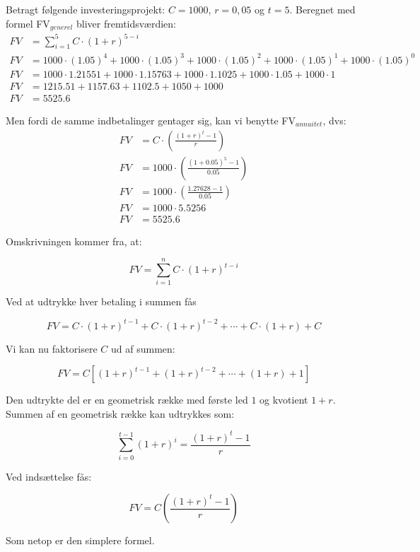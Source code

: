 \documentclass[10pt,reqno, usenames]{article}
\begin{document}
\newpage
\begin{tcolorbox}[breakable, colback=red!5!white, colframe=red!50!black, title= Eksempel 2: Beregning af fremtidsværdi for betalingsrækker]
Betragt følgende investeringsprojekt: $C=1000$, $r=0,05$ og $t=5$. Beregnet med formel FV$_{generel}$ bliver fremtidsværdien: 
\begin{align*}
FV &= \sum_{i=1}^{5} C \cdot (1 + r)^{5-i} \\
FV &= 1000 \cdot (1.05)^4 + 1000 \cdot (1.05)^3 + 1000 \cdot (1.05)^2 + 1000 \cdot (1.05)^1 + 1000 \cdot (1.05)^0 \\
FV &= 1000 \cdot 1.21551 + 1000 \cdot 1.15763 + 1000 \cdot 1.1025 + 1000 \cdot 1.05 + 1000 \cdot 1 \\
FV &= 1215.51 + 1157.63 + 1102.5 + 1050 + 1000 \\
FV &= 5525.6
\end{align*}

Men fordi de samme indbetalinger gentager sig, kan vi benytte FV$_{annuitet}$, dvs: 
\begin{align*}
FV &= C \cdot \left( \frac{(1 + r)^t - 1}{r} \right) \\
FV &= 1000 \cdot \left( \frac{(1 + 0.05)^5 - 1}{0.05} \right) \\
FV &= 1000 \cdot \left( \frac{1.27628 - 1}{0.05} \right) \\
FV &= 1000 \cdot 5.5256 \\
FV &= 5525.6
\end{align*}

Omskrivningen kommer fra, at: 

\[
FV = \sum_{i=1}^{n} C \cdot (1 + r)^{t-i}
\]

Ved at udtrykke hver betaling i summen fås

\[
FV = C \cdot (1 + r)^{t-1} + C \cdot (1 + r)^{t-2} + \cdots + C \cdot (1 + r) + C
\]

Vi kan nu faktorisere \( C \) ud af summen:

\[
FV = C \left[ (1 + r)^{t-1} + (1 + r)^{t-2} + \cdots + (1 + r) + 1 \right]
\]

Den udtrykte del er en geometrisk række med første led \( 1 \) og kvotient \( 1 + r \). Summen af en geometrisk række kan udtrykkes som:

\[
\sum_{i=0}^{t-1} (1 + r)^i = \frac{(1 + r)^t - 1}{r}
\]

Ved indsættelse fås:

\[
FV = C \left( \frac{(1 + r)^t - 1}{r} \right)
\]

Som netop er den simplere formel.
\end{tcolorbox}
\end{document}
